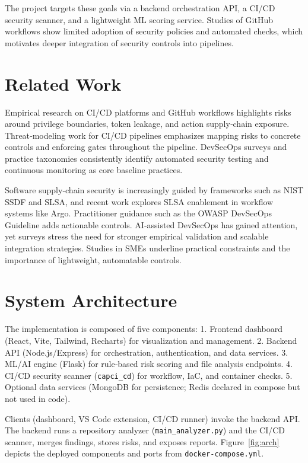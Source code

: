 \documentclass[conference]{IEEEtran}
\begin{document}
The project targets these goals via a backend orchestration API, a CI/CD security scanner, and a lightweight ML scoring service. Studies of GitHub workflows show limited adoption of security policies and automated checks, which motivates deeper integration of security controls into pipelines.\cite{ref_ayala2023}

\section{Related Work}
Empirical research on CI/CD platforms and GitHub workflows highlights risks around privilege boundaries, token leakage, and action supply‑chain exposure.\cite{ref_koishybayev2022,ref_gu2023,ref_ayala2023} Threat‑modeling work for CI/CD pipelines emphasizes mapping risks to concrete controls and enforcing gates throughout the pipeline.\cite{ref_dhandapani2025} DevSecOps surveys and practice taxonomies consistently identify automated security testing and continuous monitoring as core baseline practices.\cite{ref_mohammed2025,ref_prates2024,ref_zhao2024}

Software supply‑chain security is increasingly guided by frameworks such as NIST SSDF and SLSA, and recent work explores SLSA enablement in workflow systems like Argo.\cite{ref_nist_ssdf,ref_slsa,ref_thariq2025} Practitioner guidance such as the OWASP DevSecOps Guideline adds actionable controls.\cite{ref_owasp_devsecops} AI‑assisted DevSecOps has gained attention, yet surveys stress the need for stronger empirical validation and scalable integration strategies.\cite{ref_binbeshr2025} Studies in SMEs underline practical constraints and the importance of lightweight, automatable controls.\cite{ref_cheenepalli2025}

\section{System Architecture}
The implementation is composed of five components:
1. Frontend dashboard (React, Vite, Tailwind, Recharts) for visualization and management.
2. Backend API (Node.js/Express) for orchestration, authentication, and data services.
3. ML/AI engine (Flask) for rule‑based risk scoring and file analysis endpoints.
4. CI/CD security scanner (\texttt{capci\_cd}) for workflow, IaC, and container checks.
5. Optional data services (MongoDB for persistence; Redis declared in compose but not used in code).

Clients (dashboard, VS Code extension, CI/CD runner) invoke the backend API. The backend runs a repository analyzer (\texttt{main\_analyzer.py}) and the CI/CD scanner, merges findings, stores risks, and exposes reports. Figure~\ref{fig:arch} depicts the deployed components and ports from \texttt{docker-compose.yml}.
\end{document}
